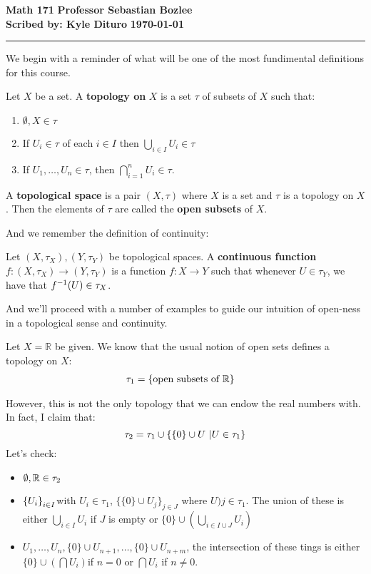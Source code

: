 \documentclass[12pt, twosided]{article}
\begin{document}
\noindent \textbf{Math 171} \hfill \textbf{Professor Sebastian Bozlee} \\
\textbf{Scribed by: Kyle Dituro} \hfill \textbf{\today}\hrule
\vspace{.2in}
We begin with a reminder of what will be one of the most fundimental definitions for this course.

\begin{df}
  Let \(X\) be a set. A \textbf{topology on} \(X\) is a set \(\tau\) of subsets 
of \(X\) such that:
\begin{enumerate}
  \item \(\emptyset, X \in \tau\)
  \item If \(U_i \in \tau\) of each \(i \in I\) then \(\bigcup_{i \in I} U_i \in \tau\)
  \item If \(U_1, \ldots, U_n \in \tau\), then \(\bigcap_{i = 1}^n U_i \in \tau\).
  \end{enumerate}
    A \textbf{topological space} is a pair \((X, \tau)\) where \(X\) is a set and \(\tau\) is a topology on \(X\). Then the elements of \(\tau\) are called the \textbf{open subsets} of \(X\).

\end{df}

And we remember the definition of continuity:

\begin{df}
  Let \((X, \tau_X), (Y, \tau_Y)\) be topological spaces. A \textbf{continuous function} \(f: (X, \tau_X) \to (Y, \tau_Y)\) is a function \(f: X \to Y\) such that whenever \(U \in \tau_Y\), we have that \(f^{-1}(U) \in \tau_X\).
\end{df}

And we'll proceed with a number of examples to guide our intuition of open-ness in a topological sense and continuity.

\begin{exa}
  Let \(X = \mathbb{R}\) be given. We know that the usual notion of open sets defines a topology on \(X\):
  \begin{align*}
    \tau_1 &= \left\{ \text{open subsets of } \mathbb{R} \right\}
  \end{align*}

  However, this is not the only topology that we can endow the real numbers with. In fact, I claim that: \[\tau_2 = \tau_1 \cup \left\{ \left\{ 0 \right\} \cup U\ \middle\vert U \in \tau_1 \right\}\]
  Let's check:
  \begin{itemize}
  \item \(\emptyset, \mathbb{R} \in \tau_2\)
  \item \(\left\{ U_i \right\}_{i \in I}\)with \(U_i \in \tau_1\), \(\{\{0\} \cup U_j\}_{j \in J}\) where \(U)j \in \tau_1\). The union of these is either \(\bigcup_{i \in I}U_i\) if \(J\) is empty or \(\{0\} \cup \left( \bigcup_{i \in I \cup J} U_i \right)\)
  \item \(U_1, \ldots, U_n, \{0\} \cup U_{n+1}, \ldots, \{0\} \cup U_{n + m}\), the intersection of these tings is either \(\{0\} \cup \left( \bigcap U_i\right)\)if \(n = 0\) or \(\bigcap U_i\) if \(n \neq 0\).
  \end{itemize}
      
\end{exa}
\end{document}
